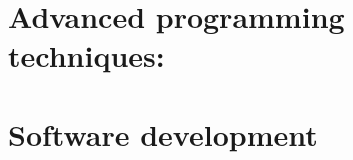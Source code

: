 \documentclass[a4paper,10pt,twoside,english]{book}
\begin{document}
   
   
  
  \part{Advanced programming techniques: }\label{PartIII}
       
              
       
        
       
       
       
       
       
       
       
   

  \part{Software development}\label{PartIV}
    
    
   
\end{document}
